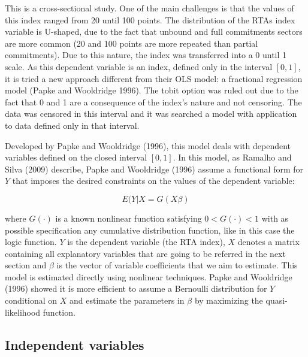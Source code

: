 \documentclass{article}
\begin{document}
\smallskip

This is a cross-sectional study. One of the main challenges is that the values of this index ranged from 20 until 100 points. The distribution of the RTAs index variable is U-shaped, due to the fact that unbound and full commitments sectors are more common (20 and 100 points are more repeated than partial commitments). Due to this nature, the index was transferred into a 0 until 1 scale. As this dependent variable is an index, defined only in the interval $[0,1]$, it is tried a new approach different from their OLS model: a fractional regression model (Papke and Wooldridge 1996). The tobit option was ruled out due to the fact that 0 and 1 are a consequence of the index’s nature and not censoring. The data was censored in this interval and it was searched a model with application to data defined only in that interval.

\smallskip

Developed by Papke and Wooldridge (1996), this model deals with dependent variables defined on the closed interval $[0,1]$. In this model, as Ramalho and Silva (2009) describe, Papke and Wooldridge (1996) assume a functional form for $Y$ that imposes the desired constraints on the values of the dependent variable:

\begin{equation}
    E(Y|X=G(X\beta)
\end{equation}

where $G(\cdot)$ is a known nonlinear function satisfying $0 < G(\cdot) < 1$ with as possible specification any cumulative distribution function, like in this case the logic function. $Y$ is the dependent variable (the RTA index), $X$ denotes a matrix containing all explanatory variables that are going to be referred in the next section and $\beta$ is the vector of variable coefficients that we aim to estimate. This model is estimated directly using nonlinear techniques. Papke and Wooldridge (1996) showed it is more efficient to assume a Bernoulli distribution for $Y$ conditional on $X$ and estimate the parameters in $\beta$ by maximizing the quasi-likelihood function.

\subsection{Independent variables}
\end{document}

